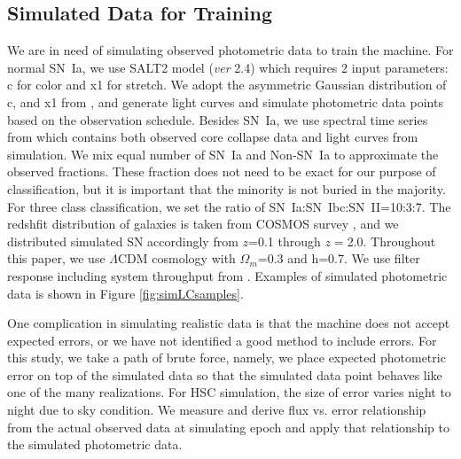 \documentclass[useamsfonts]{pasj01}
\begin{document}
\subsection{Simulated Data for Training}
\label{sec:training}
We are in need of simulating observed photometric data to train the machine.  
For normal SN~Ia, we use SALT2 \citep{guy10b} model ({\it ver} 2.4) which requires 2 input parameters: c for color and x1 for stretch.
We adopt the asymmetric Gaussian distribution of c, and x1 from \citet{mosher14a}, and generate
light curves and simulate photometric data points based on the observation schedule. 
Besides SN~Ia, we use spectral time series from \citet{kessler19b} which contains both observed
core collapse data and light curves from simulation.
We mix equal number of SN~Ia and Non-SN~Ia to approximate the observed fractions. 
These fraction does not need to be exact for our purpose of classification, but it is important
that the minority is not buried in the majority.
For three class classification, we set the ratio of SN~Ia:SN~Ibc:SN~II=10:3:7.
The redshfit distribution of galaxies is taken from COSMOS survey \citep{laigle16a}, and we distributed simulated SN accordingly from $z$=0.1 through $z=$2.0.
Throughout this paper, we use $\Lambda$CDM cosmology with $\Omega_{m}$=0.3 and h=0.7.
We use filter response including system throughput from \citet{kawanomoto18a}. 
Examples of simulated photometric data is shown in Figure \ref{fig:simLCsamples}.

One complication in simulating realistic data is that the machine does not accept expected errors, or we have not identified a good method to include errors.   
For this study, we take a path of brute force, namely, we place expected photometric error on top of the simulated data so that the simulated data point behaves like one of the many realizations.
For HSC simulation, the size of error varies night to night due to sky condition. 
We measure and derive flux vs. error relationship from the actual observed data at simulating epoch and apply that relationship to the simulated photometric data.
\end{document}
